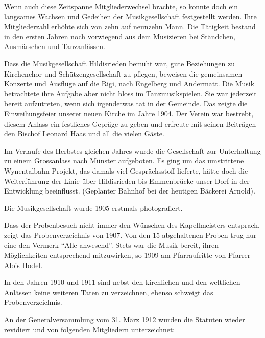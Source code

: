 \begin{history}


    Wenn auch diese Zeitspanne Mitgliederwechsel brachte, so konnte doch ein
    langsames Wachsen und Gedeihen der Musikgesellschaft festgestellt werden.
    Ihre Mitgliederzahl erhöhte sich von zehn auf neunzehn Mann. Die Tätigkeit
    bestand in den ersten Jahren noch vorwiegend aus dem Musizieren bei
    Ständchen, Ausmärschen und Tanzanlässen.

    Dass die Musikgesellschaft Hildisrieden bemüht war, gute Beziehungen zu
    Kirchenchor und Schützengesellschaft zu pflegen, beweisen die gemeinsamen
    Konzerte und Ausflüge auf die Rigi, nach Engelberg und Andermatt. Die Musik
    betrachtete ihre Aufgabe aber nicht bloss im Tanzmusikspielen, Sie war
    jederzeit bereit aufzutreten, wenn sich irgendetwas tat in der Gemeinde. Das
    zeigte die Einweihungsfeier unserer neuen Kirche im Jahre 1904. Der Verein
    war bestrebt, diesem Anlass ein festliches Gepräge zu geben und erfreute mit
    seinen Beiträgen den Bischof Leonard Haas und all die vielen Gäste.

    Im Verlaufe des Herbstes gleichen Jahres wurde die Gesellschaft zur
    Unterhaltung zu einem Grossanlass nach Münster aufgeboten. Es ging um das
    umstrittene Wynentalbahn-Projekt, das damals viel Gesprächsstoff lieferte,
    hätte doch die Weiterführung der Linie über Hildisrieden bis Emmenbrücke
    unser Dorf in der Entwicklung beeinflusst. (Geplanter Bahnhof bei der
    heutigen Bäckerei Arnold).

    Die Musikgesellschaft wurde 1905 erstmals photografiert.

    Dass der Probenbesuch nicht immer den Wünschen des Kapellmeisters entsprach,
    zeigt das Probenverzeichnis von 1907. Von den 15 abgehaltenen Proben trug
    nur eine den Vermerk \enquote{Alle anwesend}. Stets war die Musik bereit, ihren
    Möglichkeiten entsprechend mitzuwirken, so 1909 am Pfarraufritte von
    Pfarrer Alois Hodel.

    In den Jahren 1910 und 1911 sind nebst den kirchlichen und den weltlichen
    Anlässen keine weiteren Taten zu verzeichnen, ebenso schweigt das
    Probenverzeichnis.

    An der Generalversammlung vom 31. März 1912 wurden die Statuten wieder
    revidiert und von folgenden Mitgliedern unterzeichnet:


\end{history}

